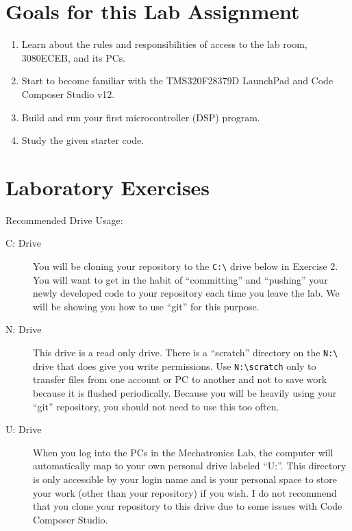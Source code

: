 \documentclass[11pt]{article}
\begin{document}
\MakeAssignmentTitle

\section*{Goals for this Lab Assignment}
%
\begin{enumerate}
    \item Learn about the rules and responsibilities of access to the lab room, 3080ECEB, and its PCs.
    \item Start to become familiar with the TMS320F28379D LaunchPad and Code Composer Studio v12.
    \item Build and run your first microcontroller (DSP) program.
    \item Study the given starter code.
\end{enumerate}
%
\section*{Laboratory Exercises}

\Ex

Recommended Drive Usage:
%
\begin{description}
    \item[\normalfont C: Drive] You will be cloning your repository to the \lstinline|C:\| drive below in Exercise 2. You will want to get in the habit of “committing” and “pushing” your newly developed code to your repository each time you leave the lab. We will be showing you how to use “git” for this purpose.
    \item[\normalfont N: Drive] This drive is a read only drive. There is a “scratch” directory on the \lstinline|N:\| drive that does give you write permissions. Use \lstinline|N:\scratch| only to transfer files from one account or PC to another and not to save work because it is flushed periodically. Because you will be heavily using your “git” repository, you should not need to use this too often.
    \item[\normalfont U: Drive] When you log into the PCs in the Mechatronics Lab, the computer will automatically map to your own personal drive labeled “U:”. This directory is only accessible by your login name and is your personal space to store your work (other than your repository) if you wish. I do not recommend that you clone your repository to this drive due to some issues with Code Composer Studio.
\end{description}
%
\Ex
\end{document}
